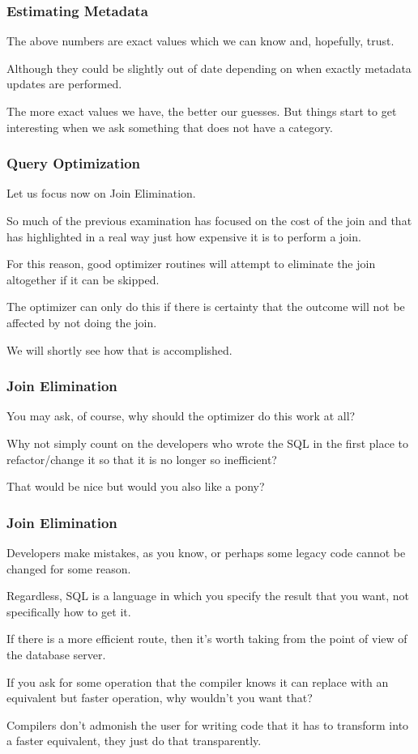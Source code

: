 \begin{frame}
\frametitle{Estimating Metadata}

The above numbers are exact values which we can know and, hopefully, trust. 

Although they could be slightly out of date depending on when exactly metadata updates are performed. 

The more exact values we have, the better our guesses. But things start to get interesting when we ask something that does not have a category.


\end{frame}

\begin{frame}
\frametitle{Query Optimization}

Let us focus now on \alert{Join Elimination}.

So much of the previous examination has focused on the cost of the join and that has highlighted in a real way just how expensive it is to perform a join. 

For this reason, good optimizer routines will attempt to eliminate the join altogether if it can be skipped. 

The optimizer can only do this if there is certainty that the outcome will not be affected by not doing the join. 

We will shortly see how that is accomplished.


\end{frame}

\begin{frame}
\frametitle{Join Elimination}

You may ask, of course, why should the optimizer do this work at all? 

Why not simply count on the developers who wrote the SQL in the first place to refactor/change it so that it is no longer so inefficient? 

That would be nice but would you also like a pony? 

\end{frame}

\begin{frame}
\frametitle{Join Elimination}

Developers make mistakes, as you know, or perhaps some legacy code cannot be changed for some reason. 

Regardless, SQL is a language in which you specify the result that you want, not specifically how to get it. 

If there is a more efficient route, then it's worth taking from the point of view of the database server. 

If you ask for some operation that the compiler knows it can replace with an equivalent but faster operation, why wouldn't you want that? 

Compilers don't admonish the user for writing code that it has to transform into a faster equivalent, they just do that transparently.


\end{frame}


